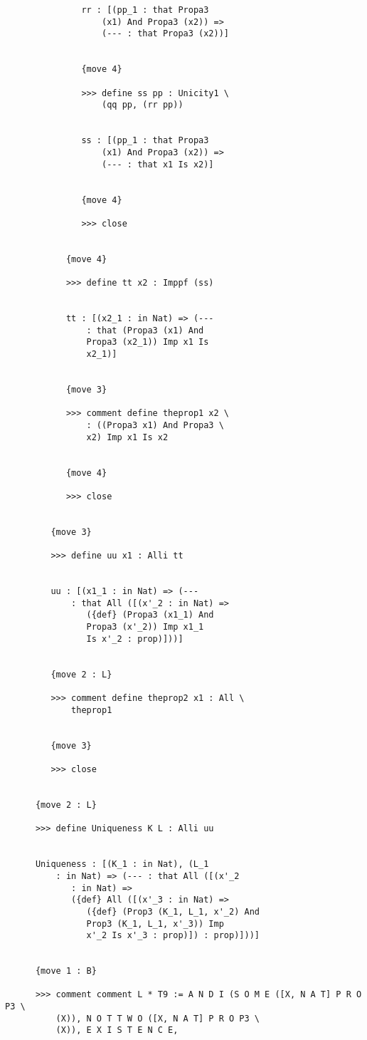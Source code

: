 \documentclass{article}
\begin{document}
\begin{verbatim}
               rr : [(pp_1 : that Propa3 
                   (x1) And Propa3 (x2)) => 
                   (--- : that Propa3 (x2))]


               {move 4}

               >>> define ss pp : Unicity1 \
                   (qq pp, (rr pp))


               ss : [(pp_1 : that Propa3 
                   (x1) And Propa3 (x2)) => 
                   (--- : that x1 Is x2)]


               {move 4}

               >>> close


            {move 4}

            >>> define tt x2 : Imppf (ss)


            tt : [(x2_1 : in Nat) => (--- 
                : that (Propa3 (x1) And 
                Propa3 (x2_1)) Imp x1 Is 
                x2_1)]


            {move 3}

            >>> comment define theprop1 x2 \
                : ((Propa3 x1) And Propa3 \
                x2) Imp x1 Is x2


            {move 4}

            >>> close


         {move 3}

         >>> define uu x1 : Alli tt


         uu : [(x1_1 : in Nat) => (--- 
             : that All ([(x'_2 : in Nat) => 
                ({def} (Propa3 (x1_1) And 
                Propa3 (x'_2)) Imp x1_1 
                Is x'_2 : prop)]))]


         {move 2 : L}

         >>> comment define theprop2 x1 : All \
             theprop1


         {move 3}

         >>> close


      {move 2 : L}

      >>> define Uniqueness K L : Alli uu


      Uniqueness : [(K_1 : in Nat), (L_1 
          : in Nat) => (--- : that All ([(x'_2 
             : in Nat) => 
             ({def} All ([(x'_3 : in Nat) => 
                ({def} (Prop3 (K_1, L_1, x'_2) And 
                Prop3 (K_1, L_1, x'_3)) Imp 
                x'_2 Is x'_3 : prop)]) : prop)]))]


      {move 1 : B}

      >>> comment comment L * T9 := A N D I (S O M E ([X, N A T] P R O P3 \
          (X)), N O T T W O ([X, N A T] P R O P3 \
          (X)), E X I S T E N C E,



\end{verbatim}
\end{document}
